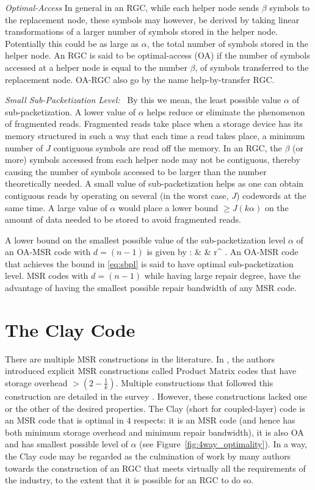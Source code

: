 \begin{multicols}{2}
\ben
\item {\em Optimal-Access} In general in an RGC, while each helper node sends $\beta$ symbols to the replacement node, these symbols may however, be derived by taking linear transformations of a larger number of symbols stored in the helper node. Potentially this could be as large as $\alpha$, the total number of symbols stored in the helper node. An RGC is said to be optimal-access (OA) if the number of symbols accessed at a helper node is equal to the number $\beta$, of symbols transferred to the replacement node. OA-RGC also go by the name help-by-transfer RGC.  
\item {\em Small Sub-Packetization Level:} \ By this we mean, the least possible value $\alpha$ of sub-packetization.  A lower value of $\alpha$ helps reduce or eliminate the phenomenon of fragmented reads. Fragmented reads take place when a storage device has its memory structured in such a way that each time a read takes place, a minimum number of $J$ contiguous symbols are read off the memory.  In an RGC, the $\beta$ (or more) symbols accessed from each helper node may not be contiguous, thereby causing the number of symbols accessed to be larger than the number theoretically needed. A small value of sub-packetization helps as one can obtain contiguous reads by operating on several (in the worst case, $J$) codewords at the same time.  A large value of $\alpha$ would place a lower bound $\geq J(k \alpha)$ on the amount of data needed to be stored to avoid fragmented reads. 

A lower bound on the smallest possible value of the sub-packetization level $\alpha$ of an OA-MSR code with $d=(n-1)$ is given by \cite{BalKum_subpkt}:
\bea
\alpha & \geq & r^{\lceil {} \rceil}. \label{eq:sbpl} 
\eea
An OA-MSR code that achieves the bound in \eqref{eq:sbpl} is said to have optimal sub-packetization level.  MSR codes with $d=(n-1)$ while having large repair degree, have the advantage of having the smallest possible repair bandwidth of any MSR code. 
\een

 \section{The Clay Code}
 There are multiple MSR constructions in the literature. In \cite{RasShaKum_PM}, the authors introduced explicit MSR constructions called Product Matrix codes that have storage overhead $> (2 -\frac{1}{k})$. Multiple constructions that followed this construction are detailed in the survey \cite{ScienceChinaBalajiKVRSK18}. However, these constructions lacked one or the other of the desired properties.  The Clay (short for coupled-layer) code is an MSR code that is optimal in $4$ respects: it is an MSR code (and hence has both minimum storage overhead and minimum repair bandwidth), it is also OA and has smallest possible level of $\alpha$ (see Figure~\ref{fig:4way_optimality}).  In a way, the Clay code may be regarded as the culmination of work by many authors towards the construction of an RGC that meets virtually all the requirements of the industry, to the extent  that it is possible for an RGC to do so.


\end{multicols}
